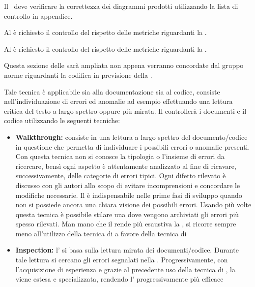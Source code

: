 \documentclass[12pt,a4paper]{article}
\begin{document}
\label{verificaUML}

Il \VR\ deve verificare la correttezza dei diagrammi  prodotti utilizzando la lista di controllo in appendice.


\label{verificaProgettazioneArchitetturale}

Al \VR{} è richiesto il controllo del rispetto delle metriche riguardanti la \FPA{}. 

\label{verificaProgettazioneDiDettaglio}

Al \VR{} è richiesto il controllo del rispetto delle metriche riguardanti la \FPD{}. 

\label{verificaCodice}

Questa sezione delle \NdP{} sarà ampliata non appena verranno concordate dal gruppo norme riguardanti la codifica in previsione della \RQ.

Tale tecnica è applicabile sia alla documentazione sia al codice, consiste nell'individuazione di errori ed anomalie ad esempio effettuando una lettura critica del testo a largo spettro oppure più mirata. Il \VR{} controllerà i documenti e il codice utilizzando le seguenti tecniche:
\begin{itemize}
	\item \textbf{Walkthrough:} consiste in una lettura a largo spettro del documento/codice in questione che permetta di individuare i possibili errori o anomalie presenti. Con questa tecnica non si conosce la tipologia o l'insieme di errori da ricercare, bensì ogni aspetto è attentamente analizzato al fine di ricavare, successivamente, delle categorie di errori tipici. Ogni difetto rilevato è discusso con gli autori allo scopo di evitare incomprensioni e concordare le modifiche necessarie. Il  è indispensabile nelle prime fasi di sviluppo quando non si possiede ancora una chiara visione dei possibili errori. Usando più volte questa tecnica è possibile stilare una  dove vengono archiviati gli errori più spesso rilevati. Man mano che il \VR{} rende più esaustiva la , si ricorre sempre meno all'utilizzo della tecnica di  a favore della tecnica di 
	\item \textbf{Inspection:} l' si basa sulla lettura mirata dei documenti/codice. Durante tale lettura si cercano gli errori segnalati nella . Progressivamente, con l'acquisizione di esperienza e grazie al precedente uso della tecnica di , la  viene estesa e specializzata, rendendo l' progressivamente più efficace
\end{itemize}
\end{document}
